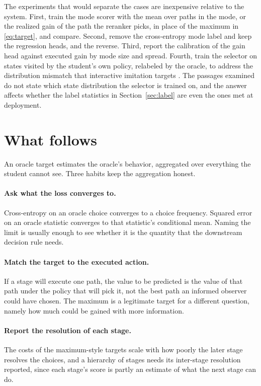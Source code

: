 \documentclass[11pt]{article}
\theoremstyle{definition}
\begin{document}
The experiments that would separate the cases are inexpensive relative to the system. First, train the mode scorer with the mean over paths in the mode, or the realized gain of the path the reranker picks, in place of the maximum in \eqref{eq:target}, and compare. Second, remove the cross-entropy mode label and keep the regression heads, and the reverse. Third, report the calibration of the gain head against executed gain by mode size and spread. Fourth, train the selector on states visited by the student's own policy, relabeled by the oracle, to address the distribution mismatch that interactive imitation targets \citep{ross2011}. The passages examined do not state which state distribution the selector is trained on, and the answer affects whether the label statistics in Section~\ref{sec:label} are even the ones met at deployment.

\section{What follows}

An oracle target estimates the oracle's behavior, aggregated over everything the student cannot see. Three habits keep the aggregation honest.

\paragraph{Ask what the loss converges to.} Cross-entropy on an oracle choice converges to a choice frequency. Squared error on an oracle statistic converges to that statistic's conditional mean. Naming the limit is usually enough to see whether it is the quantity that the downstream decision rule needs.

\paragraph{Match the target to the executed action.} If a stage will execute one path, the value to be predicted is the value of that path under the policy that will pick it, not the best path an informed observer could have chosen. The maximum is a legitimate target for a different question, namely how much could be gained with more information.

\paragraph{Report the resolution of each stage.} The costs of the maximum-style targets scale with how poorly the later stage resolves the choices, and a hierarchy of stages needs its inter-stage resolution reported, since each stage's score is partly an estimate of what the next stage can do.
\end{document}

